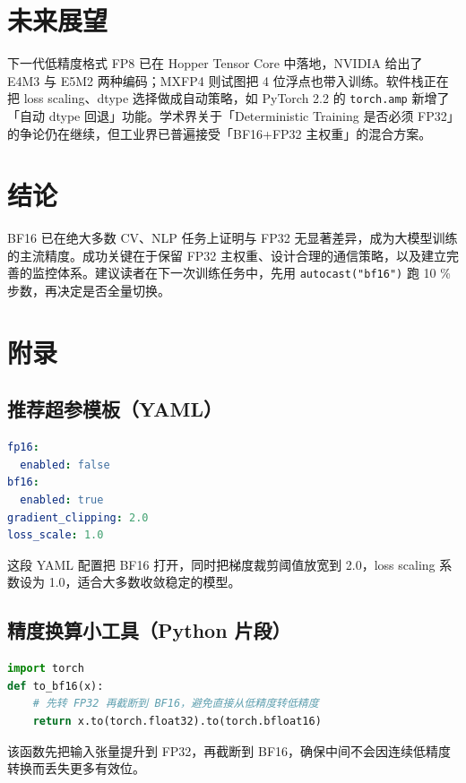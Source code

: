 \chapter{未来展望}
下一代低精度格式 FP8 已在 Hopper Tensor Core 中落地，NVIDIA 给出了 E4M3 与 E5M2 两种编码；MXFP4 则试图把 4 位浮点也带入训练。软件栈正在把 loss scaling、dtype 选择做成自动策略，如 PyTorch 2.2 的 \texttt{torch.amp} 新增了「自动 dtype 回退」功能。学术界关于「Deterministic Training 是否必须 FP32」的争论仍在继续，但工业界已普遍接受「BF16+FP32 主权重」的混合方案。\par
\chapter{结论}
BF16 已在绝大多数 CV、NLP 任务上证明与 FP32 无显著差异，成为大模型训练的主流精度。成功关键在于保留 FP32 主权重、设计合理的通信策略，以及建立完善的监控体系。建议读者在下一次训练任务中，先用 \texttt{autocast("bf16")} 跑 10 \%{} 步数，再决定是否全量切换。\par
\chapter{附录}
\section{推荐超参模板（YAML）}
\begin{lstlisting}[language=yaml]
fp16:
  enabled: false
bf16:
  enabled: true
gradient_clipping: 2.0
loss_scale: 1.0
\end{lstlisting}
这段 YAML 配置把 BF16 打开，同时把梯度裁剪阈值放宽到 2.0，loss scaling 系数设为 1.0，适合大多数收敛稳定的模型。\par
\section{精度换算小工具（Python 片段）}
\begin{lstlisting}[language=python]
import torch
def to_bf16(x):
    # 先转 FP32 再截断到 BF16，避免直接从低精度转低精度
    return x.to(torch.float32).to(torch.bfloat16)
\end{lstlisting}
该函数先把输入张量提升到 FP32，再截断到 BF16，确保中间不会因连续低精度转换而丢失更多有效位。\par
